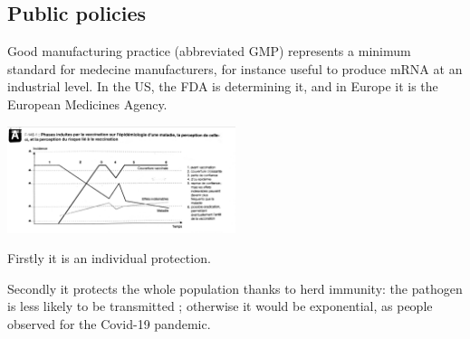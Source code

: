 \documentclass{article}
\begin{document}
        \subsection{Public policies}

            Good manufacturing practice (abbreviated GMP) represents a minimum standard for medecine manufacturers,
                for instance useful to produce mRNA at an industrial level. In the US, the FDA is determining it, and in Europe
                it is the European Medicines Agency.


                








        \begin{center}
            \includegraphics[width=0.5\textwidth, angle=90]{imgs/Perception.jpg} %
        \end{center}


            Firstly it is an individual protection.

            Secondly it protects the whole population thanks to herd immunity: the pathogen is less likely to be transmitted ; otherwise it would be exponential,
                as people observed for the Covid-19 pandemic.
\end{document}
